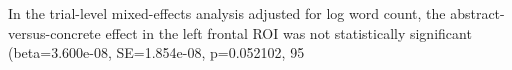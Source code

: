 In the trial-level mixed-effects analysis adjusted for log word count, the abstract-versus-concrete effect in the left frontal ROI was not statistically significant (beta=3.600e-08, SE=1.854e-08, p=0.052102, 95%
